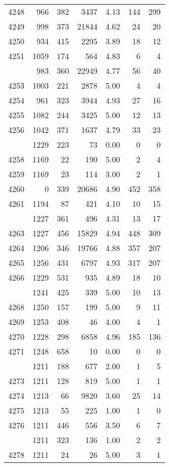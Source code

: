 \documentclass[
]{article}
\begin{document}
\begin{table}
\begin{tabular}[t]{lrrrrrr}
4248 & 966 & 382 & 3437 & 4.13 & 144 & 299\\
4249 & 998 & 373 & 21844 & 4.62 & 24 & 20\\
4250 & 934 & 415 & 2295 & 3.89 & 18 & 12\\
4251 & 1059 & 174 & 564 & 4.83 & 6 & 4\\
\addlinespace
4252 & 983 & 360 & 22949 & 4.77 & 56 & 40\\
4253 & 1003 & 221 & 2878 & 5.00 & 4 & 4\\
4254 & 961 & 323 & 3944 & 4.93 & 27 & 16\\
4255 & 1082 & 244 & 3425 & 5.00 & 12 & 13\\
4256 & 1042 & 371 & 1637 & 4.79 & 33 & 23\\
\addlinespace
4257 & 1229 & 223 & 73 & 0.00 & 0 & 0\\
4258 & 1169 & 22 & 190 & 5.00 & 2 & 4\\
4259 & 1169 & 23 & 114 & 3.00 & 2 & 1\\
4260 & 0 & 339 & 20686 & 4.90 & 452 & 358\\
4261 & 1194 & 87 & 421 & 4.10 & 10 & 15\\
\addlinespace
4262 & 1227 & 361 & 496 & 4.31 & 13 & 17\\
4263 & 1227 & 456 & 15829 & 4.94 & 448 & 309\\
4264 & 1206 & 346 & 19766 & 4.88 & 357 & 207\\
4265 & 1256 & 431 & 6797 & 4.93 & 317 & 207\\
4266 & 1229 & 531 & 935 & 4.89 & 18 & 10\\
\addlinespace
4267 & 1241 & 425 & 339 & 5.00 & 10 & 13\\
4268 & 1250 & 157 & 199 & 5.00 & 9 & 11\\
4269 & 1253 & 408 & 46 & 4.00 & 4 & 1\\
4270 & 1228 & 298 & 6858 & 4.96 & 185 & 136\\
4271 & 1248 & 658 & 10 & 0.00 & 0 & 0\\
\addlinespace
4272 & 1211 & 188 & 677 & 2.00 & 1 & 5\\
4273 & 1211 & 128 & 819 & 5.00 & 1 & 1\\
4274 & 1213 & 66 & 9820 & 3.60 & 25 & 14\\
4275 & 1213 & 55 & 225 & 1.00 & 1 & 0\\
4276 & 1211 & 446 & 556 & 3.50 & 6 & 7\\
\addlinespace
4277 & 1211 & 323 & 136 & 1.00 & 2 & 2\\
4278 & 1211 & 24 & 26 & 5.00 & 3 & 1\\

\end{tabular}
\end{table}
\end{document}
